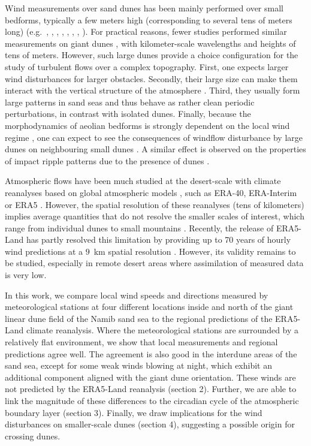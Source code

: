 Wind measurements over sand dunes has been mainly performed over small bedforms, typically a few meters high (corresponding to several tens of meters long) (e.g.~\citet{Mulligan1988}, \citet{Hesp1989}, \citet{Lancaster1996}, \citet{MckennaNeuman1997}, \citet{Sauermann2003}, \citet{Andreotti2002}, \citet{Walker2002}, \citet{Weaver2011}). For practical reasons, fewer studies performed similar measurements on giant dunes \citep{Havholm1988}, with kilometer-scale wavelengths and heights of tens of meters. However, such large dunes provide a choice configuration for the study of turbulent flows over a complex topography. First, one expects larger wind disturbances for larger obstacles. Secondly, their large size can make them interact with the vertical structure of the atmosphere \citep{Andreotti2009}. Third, they usually form large patterns in sand seas and thus behave as rather clean periodic perturbations, in contrast with isolated dunes. Finally, because the morphodynamics of aeolian bedforms is strongly dependent on the local wind regime \citep{Livingstone2019}, one can expect to see the consequences of windflow disturbance by large dunes on neighbouring small dunes \citep{Brookfield1977, Ewing2006}. A similar effect is observed on the properties of impact ripple patterns due to the presence of dunes \citep{Howard1977, Hood2021}.

Atmospheric flows have been much studied at the desert-scale with climate reanalyses based on global atmospheric models \citep{Blumberg1996, Livingstone2010, Ashkenazy2012, Jolivet2021, Hu2021, gunn2021}, such as ERA-40, ERA-Interim or ERA5 \citep{Uppala2005, Dee2011, Hersbach2020}. However, the spatial resolution of these reanalyses (tens of kilometers) implies average quantities that do not resolve the smaller scales of interest, which range from individual dunes to small mountains \citep{Livingstone2010}. Recently, the release of ERA5-Land has partly resolved this limitation by providing up to 70 years of hourly wind predictions at a $9$~km spatial resolution \citep{munoz2021}. However, its validity remains to be studied, especially in remote desert areas where assimilation of measured data is very low.

In this work, we compare local wind speeds and directions measured by meteorological stations at four different locations inside and north of the giant linear dune field of the Namib sand sea to the regional predictions of the ERA5-Land climate reanalysis. Where the meteorological stations are surrounded by a relatively flat environment, we show that local measurements and regional predictions agree well. The agreement is also good in the interdune areas of the sand sea, except for some weak winds blowing at night, which exhibit an additional component aligned with the giant dune orientation. These winds are not predicted by the ERA5-Land reanalysis (section 2). Further, we are able to link the magnitude of these differences to the circadian cycle of the atmospheric boundary layer (section 3). Finally, we draw implications for the wind disturbances on smaller-scale dunes (section 4), suggesting a possible origin for crossing dunes.


